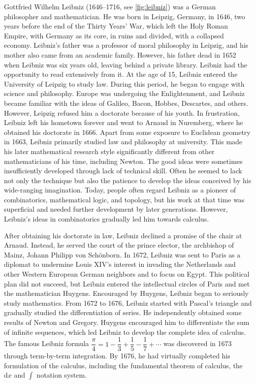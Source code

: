 \documentclass[b5paper]{article}
\begin{document}
\begin{mdframed}
Gottfried Wilhelm Leibniz (1646–1716, see \cref{fig:leibniz}) was a German philosopher and mathematician. He was born in Leipzig, Germany, in 1646, two years before the end of the Thirty Years' War, which left the Holy Roman Empire, with Germany as its core, in ruins and divided, with a collapsed economy. Leibniz's father was a professor of moral philosophy in Leipzig, and his mother also came from an academic family. However, his father dead in 1652 when Leibniz was six years old, leaving behind a private library. Leibniz had the opportunity to read extensively from it. At the age of 15, Leibniz entered the University of Leipzig to study law. During this period, he began to engage with science and philosophy. Europe was undergoing the Enlightenment, and Leibniz became familiar with the ideas of Galileo, Bacon, Hobbes, Descartes, and others. However, Leipzig refused him a doctorate because of his youth. In frustration, Leibniz left his hometown forever and went to Arnaud in Nuremberg, where he obtained his doctorate in 1666. Apart from some exposure to Euclidean geometry in 1663, Leibniz primarily studied law and philosophy at university. This made his later mathematical research style significantly different from other mathematicians of his time, including Newton. The good ideas were sometimes insufficiently developed through lack of technical skill. Often he seemed to lack not only the technique but also the patience to develop the ideas conceived by his wide-ranging imagination. Today, people often regard Leibniz as a pioneer of combinatorics, mathematical logic, and topology, but his work at that time was superficial and needed further development by later generations. However, Leibniz's ideas in combinatorics gradually led him towards calculus.

After obtaining his doctorate in law, Leibniz declined a promise of the chair at Arnaud. Instead, he served the court of the prince elector, the archbishop of Mainz, Johann Philipp von Schönborn. In 1672, Leibniz was sent to Paris as a diplomat to undermine Louis XIV's interest in invading the Netherlands and other Western European German neighbors and to focus on Egypt. This political plan did not succeed, but Leibniz entered the intellectual circles of Paris and met the mathematician Huygens. Encouraged by Huygens, Leibniz began to seriously study mathematics. From 1672 to 1676, Leibniz started with Pascal's triangle and gradually studied the differentiation of series. He independently obtained some results of Newton and Gregory. Huygens encouraged him to differentiate the sum of infinite sequences, which led Leibniz to develop the complete idea of calculus. The famous Leibniz formula $\dfrac{\pi}{4} = 1 - \dfrac{1}{3} + \dfrac{1}{5} - \dfrac{1}{7} + \dotsb$ was discovered in 1673 through term-by-term integration. By 1676, he had virtually completed his formulation of the calculus, including the fundamental theorem of calculus, the $\mathrm{d} x$ and $\int$ notation system.


\end{mdframed}
\end{document}

